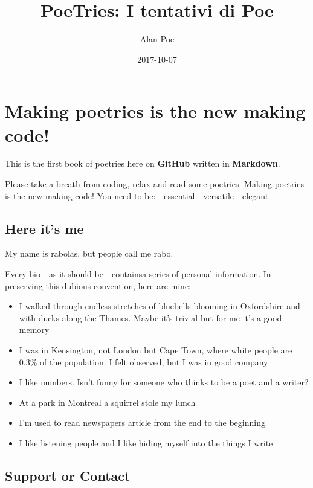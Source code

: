 \documentclass[]{book}
\title{PoeTries: I tentativi di Poe}
\author{Alan Poe}
\date{2017-10-07}
\providecommand{\tightlist}{%
  \setlength{\itemsep}{0pt}\setlength{\parskip}{0pt}}
\begin{document}
\maketitle

{
\setcounter{tocdepth}{1}
\tableofcontents
}
\chapter*{Making poetries is the new making
code!}\label{making-poetries-is-the-new-making-code}

This is the first book of poetries here on \textbf{GitHub} written in
\textbf{Markdown}.

Please take a breath from coding, relax and read some poetries. Making
poetries is the new making code! You need to be: - essential - versatile
- elegant

\section*{Here it's me}\label{here-its-me}

My name is rabolas, but people call me rabo.

Every bio - as it should be - containsa series of personal information.
In preserving this dubious convention, here are mine:

\begin{itemize}
\tightlist
\item
  I walked through endless stretches of bluebells blooming in
  Oxfordshire and with ducks along the Thames. Maybe it's trivial but
  for me it's a good memory
\item
  I was in Kensington, not London but Cape Town, where white people are
  0.3\% of the population. I felt observed, but I was in good company
\item
  I like numbers. Isn't funny for someone who thinks to be a poet and a
  writer?
\item
  At a park in Montreal a squirrel stole my lunch
\item
  I'm used to read newspapers article from the end to the beginning
\item
  I like listening people and I like hiding myself into the things I
  write
\end{itemize}

\section*{Support or Contact}\label{support-or-contact}
\end{document}
